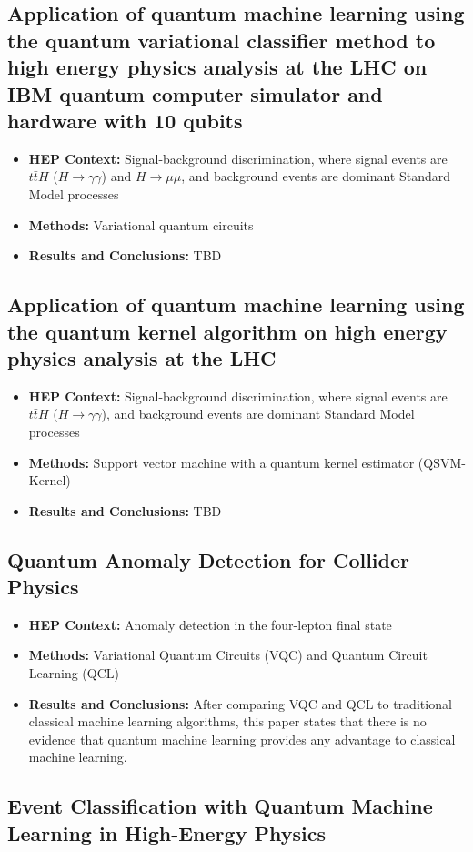 \subsection{Application of quantum machine learning using the quantum variational classifier method to high energy physics analysis at the LHC on IBM quantum computer simulator and hardware with 10 qubits~\cite{Wu:2020cye}}
\begin{itemize}
	\item \textbf{HEP Context: }Signal-background discrimination, where signal events are $t\bar{t}H$ ($H\rightarrow\gamma\gamma$) and $H\rightarrow\mu\mu$, and background events are dominant Standard Model processes
	\item \textbf{Methods: }Variational quantum circuits
	\item \textbf{Results and Conclusions: }TBD
\end{itemize}\subsection{Application of quantum machine learning using the quantum kernel algorithm on high energy physics analysis at the LHC~\cite{Wu:2021xsj}}
\begin{itemize}
	\item \textbf{HEP Context: }Signal-background discrimination, where signal events are $t\bar{t}H$ ($H\rightarrow\gamma\gamma$), and background events are dominant Standard Model processes
	\item \textbf{Methods: }Support vector machine with a quantum kernel estimator (QSVM-Kernel)
	\item \textbf{Results and Conclusions: }TBD
\end{itemize}\subsection{Quantum Anomaly Detection for Collider Physics~\cite{Alvi:2022fkk}}
\begin{itemize}
	\item \textbf{HEP Context: }Anomaly detection in the four-lepton final state
	\item \textbf{Methods: }Variational Quantum Circuits (VQC) and Quantum Circuit Learning (QCL)
	\item \textbf{Results and Conclusions: }After comparing VQC and QCL to traditional classical machine learning algorithms, this paper states that there is no evidence that quantum machine learning provides any advantage to classical machine learning.
\end{itemize}\subsection{Event Classification with Quantum Machine Learning in High-Energy Physics~\cite{Terashi:2020wfi}}
